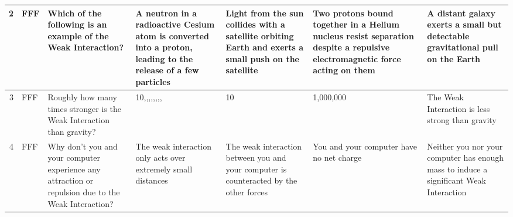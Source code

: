 \documentclass[10pt]{article}
\begin{document}
\begin{tiny}
\begin{longtable}{|r|p{0.375in}|p{1.275in}|p{0.75in}|p{0.75in}|p{0.75in}|p{0.75in}|}
    2     &     FFF &                                                                                                                                                                                                                    Which of the following is an example of the Weak Interaction? &                          A neutron in a radioactive Cesium atom is converted into a proton, leading to the release of a few particles &  Light from the sun collides with a satellite orbiting Earth and exerts a small push on the satellite &  Two protons bound together in a Helium nucleus resist separation despite a repulsive electromagnetic force acting on them &                                                   A distant galaxy exerts a small but detectable gravitational pull on the  Earth \\\hline
    3     &     FFF &                                                                                                                                                                                                            Roughly how many times stronger is the Weak Interaction than gravity? &                                                                                                    10,\-000,\-000,\-000,\-000,\-000,\-000,\-000,\-000 &                                                                                                    10 &                                                                                                                  1,000,000 &                                                                                  The Weak Interaction is less strong than gravity \\\hline
    4     &     FFF &                                                                                                                                                                              Why don't you and your computer experience any attraction or repulsion due to the Weak Interaction? &                                                                         The weak interaction only acts over extremely small distances &                The weak interaction between you and your computer is counteracted by the other forces &                                                                                   You and your computer have no net charge &                                            Neither you nor your computer has enough mass to induce a significant Weak Interaction \\\hline

\end{longtable}
\end{tiny}
\end{document}
